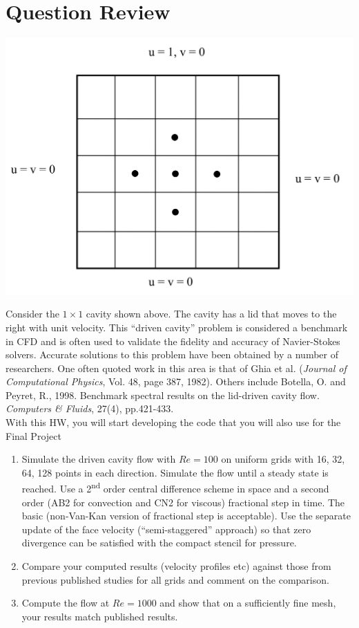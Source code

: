 \documentclass[12pt]{article}
\begin{document}
\section{Question Review}
\begin{center}
    \includegraphics[width=0.6\linewidth]{figures/Question_grid.jpg}
\end{center}
Consider the \( 1 \times 1 \) cavity shown above. The cavity has a lid that moves to the right with unit velocity. This ``driven cavity'' problem is considered a benchmark in CFD and is often used to validate the fidelity and accuracy of Navier-Stokes solvers. Accurate solutions to this problem have been obtained by a number of researchers. One often quoted work in this area is that of Ghia et al. (\textit{Journal of Computational Physics}, Vol. 48, page 387, 1982)\cite{GHIA1982387}. Others include Botella, O. and Peyret, R., 1998. Benchmark spectral results on the lid-driven cavity flow. \textit{Computers \& Fluids}, 27(4), pp.421-433.\cite{BOTELLA1998421}\\




With this HW, you will start developing the code that you will also use for the Final Project

\begin{enumerate}
    \item Simulate the driven cavity flow with \( Re=100 \) on uniform grids with 16, 32, 64, 128 points in each direction. Simulate the flow until a steady state is reached. Use a 2\textsuperscript{nd} order central difference scheme in space and a second order (AB2 for convection and CN2 for viscous) fractional step in time. The basic (non-Van-Kan version of fractional step is acceptable). Use the separate update of the face velocity (``semi-staggered'' approach) so that zero divergence can be satisfied with the compact stencil for pressure.

    \item Compare your computed results (velocity profiles etc) against those from previous published studies for all grids and comment on the comparison.

    \item Compute the flow at \( Re=1000 \) and show that on a sufficiently fine mesh, your results match published results.
\end{enumerate}
\end{document}
